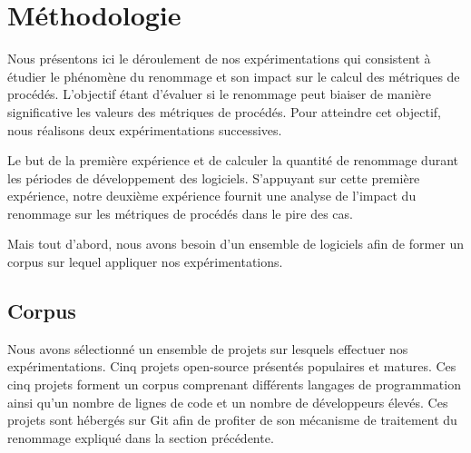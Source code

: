 \section{Méthodologie}
\label{sec:methodologie}

Nous présentons ici le déroulement de nos expérimentations qui consistent à étudier le phénomène du renommage et son impact sur le calcul des métriques de procédés. L’objectif étant d’évaluer si le renommage peut biaiser de manière significative les valeurs des métriques de procédés. Pour atteindre cet objectif, nous réalisons deux expérimentations successives.

Le but de la première expérience et de calculer la quantité de renommage durant les périodes de développement des logiciels. S’appuyant sur cette première expérience, notre deuxième expérience fournit une analyse de l’impact du renommage sur les métriques de procédés dans le pire des cas. 

Mais tout d'abord, nous avons besoin d'un ensemble de logiciels afin de former un corpus sur lequel appliquer nos expérimentations. 

\subsection{Corpus}

Nous avons sélectionné un ensemble de projets sur lesquels effectuer nos expérimentations. Cinq projets open-source présentés  populaires et matures. Ces cinq projets forment un corpus comprenant différents langages de programmation ainsi qu'un nombre de lignes de code et un nombre de développeurs élevés.
Ces projets sont hébergés sur Git afin de profiter de son mécanisme de traitement du renommage expliqué dans la section précédente. \\


